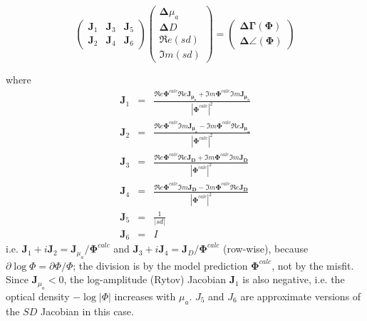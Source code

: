 \documentclass[12pt]{book}               %
\begin{document}
\begin{equation}\label{eq:logphase}
\left(
\begin{array}{lll}
\mathbf{J}_1 & \mathbf{J}_3 & \mathbf{J}_5\\
\mathbf{J}_2 & \mathbf{J}_4 & \mathbf{J}_6
\end{array}\right)
\left(
\begin{array}{l}
\boldsymbol{\Delta}{\mu_a}\\
\boldsymbol{\Delta}{D}\\
\Re e({sd})\\
\Im m({sd})
\end{array}
\right)=\left(
\begin{array}{l}
{\boldsymbol{\Delta\Gamma(\Phi)}}\\
{\boldsymbol{\Delta\angle(\Phi)}}
\end{array}\right)
\end{equation}

where
\begin{eqnarray}\nonumber
\mathbf{J}_1&=&\frac{\Re e{\boldsymbol{\Phi}^{calc}}\Re e{\boldsymbol{\mathbf{J}_{\mu_a}}}
+\Im m{\boldsymbol{\Phi}^{calc}}\Im m{\boldsymbol{\mathbf{J}_{\mu_a}}} }{|\boldsymbol{\Phi}^{calc}|^2} \\\nonumber
\mathbf{J}_2&=&\frac{\Re e{\boldsymbol{\Phi}^{calc}}\Im m{\boldsymbol{\mathbf{J}_{\mu_a}}}
-\Im m{\boldsymbol{\Phi}^{calc}}\Re e{\boldsymbol{\mathbf{J}_{\mu_a}}} }{|\boldsymbol{\Phi}^{calc}|^2} \\
\mathbf{J}_3&=&\frac{\Re e{\boldsymbol{\Phi}^{calc}}\Re e{\boldsymbol{\mathbf{J}_{D}}}
+\Im m{\boldsymbol{\Phi}^{calc}}\Im m{\boldsymbol{\mathbf{J}_{D}}} }{|\boldsymbol{\Phi}^{calc}|^2} \\\nonumber
\mathbf{J}_4&=&\frac{\Re e{\boldsymbol{\Phi}^{calc}}\Im m{\boldsymbol{\mathbf{J}_{D}}}
-\Im m{\boldsymbol{\Phi}^{calc}}\Re e{\boldsymbol{\mathbf{J}_{D}}} }{|\boldsymbol{\Phi}^{calc}|^2} \\\nonumber
\mathbf{J}_5&=& \frac{1}{|sd|} \\\nonumber
\mathbf{J}_6&=& I \nonumber
\end{eqnarray}
i.e. $\mathbf{J}_1+i\mathbf{J}_2=\mathbf{J}_{\mu_a}/\boldsymbol{\Phi}^{calc}$ and $\mathbf{J}_3+i\mathbf{J}_4=\mathbf{J}_{D}/\boldsymbol{\Phi}^{calc}$
(row-wise), because $\partial\log\Phi=\partial\Phi/\Phi$; the division is by the model prediction
$\boldsymbol{\Phi}^{calc}$, not by the misfit. Since $\mathbf{J}_{\mu_a}<0$, the log-amplitude (Rytov) Jacobian
$\mathbf{J}_1$ is also negative, i.e. the optical density $-\log|\Phi|$ increases with $\mu_a$.
$J_5$ and $J_6$ are approximate versions of the $SD$ Jacobian in this case.
\end{document}
